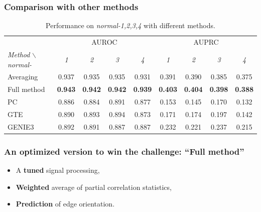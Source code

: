 \documentclass[final]{beamer}
\begin{document}
\begin{frame}
\frametitle{Comparison with other methods}



\begin{table}[t]

\caption{Performance on \textit{normal-1,2,3,4} with different methods.}
\label{tab:comparison}
\centering
\tiny
\begin{tabular}{| l | c c c c | c c c c |}
\hline
& \multicolumn{4}{c|}{AUROC} & \multicolumn{4}{c|}{AUPRC} \\
\textit{Method} $\backslash$ \textit{normal-} & \textit{1} & \textit{2} & \textit{3} & \textit{4} & \textit{1} & \textit{2} & \textit{3} & \textit{4} \\
\hline
\hline
Averaging           					& 0.937 & 0.935 & 0.935 & 0.931 & 0.391 &  0.390 &  0.385 & 0.375\\
Full method           					& \textbf{0.943} & \textbf{0.942} & \textbf{0.942} & \textbf{0.939} & \textbf{0.403} & \textbf{0.404} & \textbf{0.398} & \textbf{0.388}\\
\hline
PC & 0.886 & 0.884 & 0.891 &  0.877 & 0.153 & 0.145 & 0.170 & 0.132\\
GTE & 0.890 & 0.893 & 0.894 & 0.873 & 0.171 & 0.174 & 0.197 & 0.142\\
GENIE3 & 0.892 & 0.891 & 0.887 & 0.887 & 0.232 & 0.221 & 0.237 & 0.215 \\
\hline
\end{tabular}
\end{table}

\end{frame}



\begin{frame}
\frametitle{An optimized version to win the challenge: ``Full method''}

\begin{itemize}
\item A \textbf{tuned} signal processing,
\item \textbf{Weighted} average of partial correlation statistics,
\item \textbf{Prediction} of edge orientation.
\end{itemize}

\end{frame}

\end{document}
